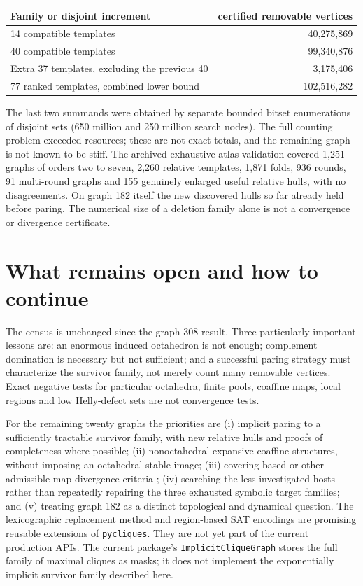 \documentclass[11pt,a4paper]{article}
\theoremstyle{definition}\newtheorem{definition}[theorem]{Definition}\newtheorem{example}[theorem]{Example}
\theoremstyle{remark}\newtheorem{remark}[theorem]{Remark}
\newcommand{\code}[1]{\texttt{#1}}
\begin{document}
\begin{center}\begin{tabular}{lr}\toprule
Family or disjoint increment&certified removable vertices\\\midrule
14 compatible templates&40,275,869\\
40 compatible templates&99,340,876\\
Extra 37 templates, excluding the previous 40&3,175,406\\\midrule
77 ranked templates, combined lower bound&102,516,282\\\bottomrule\end{tabular}\end{center}
The last two summands were obtained by separate bounded bitset enumerations of disjoint sets (650 million and 250 million search nodes). The full counting problem exceeded resources; these are not exact totals, and the remaining graph is not known to be stiff. The archived exhaustive atlas validation covered 1,251 graphs of orders two to seven, 2,260 relative templates, 1,871 folds, 936 rounds, 91 multi-round graphs and 155 genuinely enlarged useful relative hulls, with no disagreements. On graph 182 itself the new discovered hulls so far already held before paring. The numerical size of a deletion family alone is not a convergence or divergence certificate.

\section{What remains open and how to continue}
The census is unchanged since the graph 308 result. Three particularly important lessons are: an enormous induced octahedron is not enough; complement domination is necessary but not sufficient; and a successful paring strategy must characterize the survivor family, not merely count many removable vertices. Exact negative tests for particular octahedra, finite pools, coaffine maps, local regions and low Helly-defect sets are not convergence tests.

For the remaining twenty graphs the priorities are (i) implicit paring to a sufficiently tractable survivor family, with new relative hulls and proofs of completeness where possible; (ii) nonoctahedral expansive coaffine structures, without imposing an octahedral stable image; (iii) covering-based or other admissible-map divergence criteria \cite{relations}; (iv) searching the less investigated hosts rather than repeatedly repairing the three exhausted symbolic target families; and (v) treating graph 182 as a distinct topological and dynamical question. The lexicographic replacement method and region-based SAT encodings are promising reusable extensions of \code{pycliques}. They are not yet part of the current production APIs. The current package's \code{ImplicitCliqueGraph} stores the full family of maximal cliques as masks; it does not implement the exponentially implicit survivor family described here.
\end{document}
